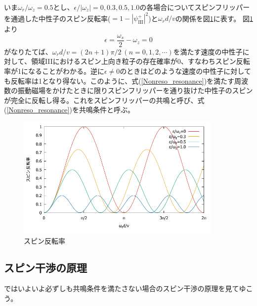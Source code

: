 いま$\omega_r/\omega_z=0.5$とし、$\epsilon/|\omega_z|=0,0.3,0.5,1.0$の各場合についてスピンフリッパーを通過した中性子のスピン反転率($=1-|\psi_\mathrm{III}^+|^2$)と$\omega_r d/v$の関係を図\ref{Nonreso_fig_reversalrate}に表す。
図\ref{Nonreso_fig_reversalrate}より
\begin{equation}
\epsilon=\frac{\omega_s}{2}-\omega_z=0 \label{Nonreso_resonance}
\end{equation}
がなりたてば、$\omega_r d/v =(2n+1)\pi/2 \ (n =0,1,2,\cdots)$を満たす速度の中性子に対して、領域IIIにおけるスピン上向き粒子の存在確率が0、すなわちスピン反転率が1になることがわかる。逆に$\epsilon \neq 0$のときはどのような速度の中性子に対しても反転率は1となり得ない。このように、式(\ref{Nonreso_resonance})を満たす周波数の振動磁場をかけたときに限りスピンフリッパーを通り抜けた中性子のスピンが完全に反転し得る。これをスピンフリッパーの共鳴と呼び、式(\ref{Nonreso_resonance})を共鳴条件と呼ぶ。
\begin{figure}[h]
\begin{center}
\includegraphics[width=10cm]{nonreso/resonance_reversalrate.pdf}
\caption{スピン反転率}
\label{Nonreso_fig_reversalrate}
\end{center}
\end{figure}



\subsection{スピン干渉の原理}
ではいよいよ必ずしも共鳴条件を満たさない場合のスピン干渉の原理を見てゆこう。

